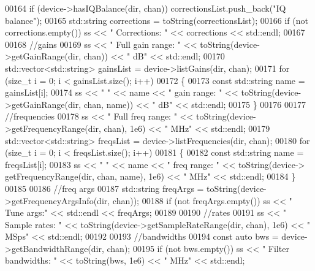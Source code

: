 \begin{DoxyCode}
00164     \textcolor{keywordflow}{if} (device->hasIQBalance(dir, chan)) correctionsList.push\_back(\textcolor{stringliteral}{"IQ balance"});
00165     std::string corrections = toString(correctionsList);
00166     \textcolor{keywordflow}{if} (not corrections.empty()) ss << \textcolor{stringliteral}{"  Corrections: "} << corrections << std::endl;
00167 
00168     \textcolor{comment}{//gains}
00169     ss << \textcolor{stringliteral}{"  Full gain range: "} << toString(device->getGainRange(dir, chan)) << \textcolor{stringliteral}{" dB"} << std::endl;
00170     std::vector<std::string> gainsList = device->listGains(dir, chan);
00171     \textcolor{keywordflow}{for} (\textcolor{keywordtype}{size\_t} i = 0; i < gainsList.size(); i++)
00172     \{
00173         \textcolor{keyword}{const} std::string name = gainsList[i];
00174         ss << \textcolor{stringliteral}{"    "} << name << \textcolor{stringliteral}{" gain range: "} << toString(device->getGainRange(dir, chan, name)) << \textcolor{stringliteral}{" dB"}
       << std::endl;
00175     \}
00176 
00177     \textcolor{comment}{//frequencies}
00178     ss << \textcolor{stringliteral}{"  Full freq range: "} << toString(device->getFrequencyRange(dir, chan), 1e6) << \textcolor{stringliteral}{" MHz"} << 
      std::endl;
00179     std::vector<std::string> freqsList = device->listFrequencies(dir, chan);
00180     \textcolor{keywordflow}{for} (\textcolor{keywordtype}{size\_t} i = 0; i < freqsList.size(); i++)
00181     \{
00182         \textcolor{keyword}{const} std::string name = freqsList[i];
00183         ss << \textcolor{stringliteral}{"    "} << name << \textcolor{stringliteral}{" freq range: "} << toString(device->
      getFrequencyRange(dir, chan, name), 1e6) << \textcolor{stringliteral}{" MHz"} << std::endl;
00184     \}
00185 
00186     \textcolor{comment}{//freq args}
00187     std::string freqArgs = toString(device->getFrequencyArgsInfo(dir, chan));
00188     \textcolor{keywordflow}{if} (not freqArgs.empty()) ss << \textcolor{stringliteral}{"  Tune args:"} << std::endl << freqArgs;
00189 
00190     \textcolor{comment}{//rates}
00191     ss << \textcolor{stringliteral}{"  Sample rates: "} << toString(device->getSampleRateRange(dir, chan), 1e6) << \textcolor{stringliteral}{" MSps"} << 
      std::endl;
00192 
00193     \textcolor{comment}{//bandwidths}
00194     \textcolor{keyword}{const} \textcolor{keyword}{auto} bws = device->getBandwidthRange(dir, chan);
00195     \textcolor{keywordflow}{if} (not bws.empty()) ss << \textcolor{stringliteral}{"  Filter bandwidths: "} << toString(bws, 1e6) << \textcolor{stringliteral}{" MHz"} << std::endl;

\end{DoxyCode}
